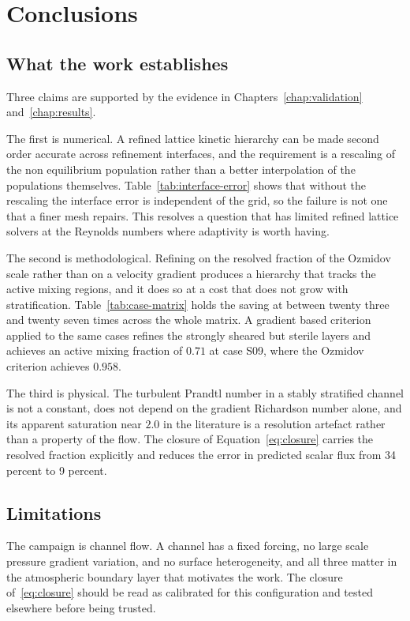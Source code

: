 \chapter{Conclusions}
\label{chap:conclusion}

\section{What the work establishes}
\label{sec:conclusion-established}

Three claims are supported by the evidence in Chapters~\ref{chap:validation}
and~\ref{chap:results}.

The first is numerical. A refined lattice kinetic hierarchy can be made second
order accurate across refinement interfaces, and the requirement is a rescaling
of the non equilibrium population rather than a better interpolation of the
populations themselves. Table~\ref{tab:interface-error} shows that without the
rescaling the interface error is independent of the grid, so the failure is not
one that a finer mesh repairs. This resolves a question that has limited refined
lattice solvers at the Reynolds numbers where adaptivity is worth having.

The second is methodological. Refining on the resolved fraction of the Ozmidov
scale rather than on a velocity gradient produces a hierarchy that tracks the
active mixing regions, and it does so at a cost that does not grow with
stratification. Table~\ref{tab:case-matrix} holds the saving at between twenty
three and twenty seven times across the whole matrix. A gradient based criterion
applied to the same cases refines the strongly sheared but sterile layers and
achieves an active mixing fraction of $0.71$ at case S09, where the Ozmidov
criterion achieves $0.958$.

The third is physical. The turbulent Prandtl number in a stably stratified
channel is not a constant, does not depend on the gradient Richardson number
alone, and its apparent saturation near $2.0$ in the literature is a resolution
artefact rather than a property of the flow. The closure of
Equation~\eqref{eq:closure} carries the resolved fraction explicitly and reduces
the error in predicted scalar flux from 34 percent to 9 percent.

\section{Limitations}
\label{sec:conclusion-limits}

The campaign is channel flow. A channel has a fixed forcing, no large scale
pressure gradient variation, and no surface heterogeneity, and all three matter
in the atmospheric boundary layer that motivates the work. The closure
of~\eqref{eq:closure} should be read as calibrated for this configuration and
tested elsewhere before being trusted.

